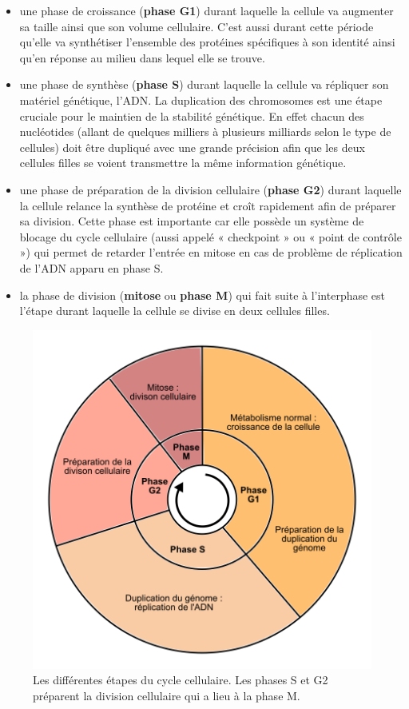 \documentclass[12pt,a4paper,twoside,openright]{book}
\begin{document}
\begin{itemize}
\item
  une phase de croissance (\textbf{phase G1}) durant laquelle la cellule
  va augmenter sa taille ainsi que son volume cellulaire. C'est aussi
  durant cette période qu'elle va synthétiser l'ensemble des protéines
  spécifiques à son identité ainsi qu'en réponse au milieu dans lequel
  elle se trouve.
\item
  une phase de synthèse (\textbf{phase S}) durant laquelle la cellule va
  répliquer son matériel génétique, l'ADN. La duplication des
  chromosomes est une étape cruciale pour le maintien de la stabilité
  génétique. En effet chacun des nucléotides (allant de quelques
  milliers à plusieurs milliards selon le type de cellules) doit être
  dupliqué avec une grande précision afin que les deux cellules filles
  se voient transmettre la même information génétique.
\item
  une phase de préparation de la division cellulaire (\textbf{phase G2})
  durant laquelle la cellule relance la synthèse de protéine et croît
  rapidement afin de préparer sa division. Cette phase est importante
  car elle possède un système de blocage du cycle cellulaire (aussi
  appelé « checkpoint » ou « point de contrôle ») qui permet de retarder
  l'entrée en mitose en cas de problème de réplication de l'ADN apparu
  en phase S.
\item
  la phase de division (\textbf{mitose} ou \textbf{phase M}) qui fait
  suite à l'interphase est l'étape durant laquelle la cellule se divise
  en deux cellules filles.
\end{itemize}

\begin{figure}[htbp]
\centering
\includegraphics{figures/intro/cycle.png}
\caption[Les différentes étapes du cycle cellulaire]{\label{fig:cycle}Les
différentes étapes du cycle cellulaire. Les phases S et G2 préparent la
division cellulaire qui a lieu à la phase M.}
\end{figure}
\end{document}
